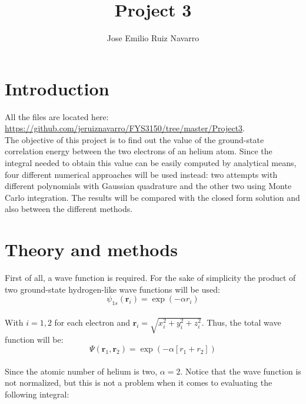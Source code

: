 \documentclass[11pt,a4paper,oneside]{article}
\begin{document}
	\title{\textbf{\textbf{\Huge Project 3}}}
	\author{Jose Emilio Ruiz Navarro}
	\maketitle
	
	\section{Introduction}
	
		All the files are located here: \url{https://github.com/jeruiznavarro/FYS3150/tree/master/Project3}.\\
	
		The objective of this project is to find out the value of the ground-state correlation energy between the two electrons of an helium atom. Since the integral needed to obtain this value can be easily computed by analytical means, four different numerical approaches will be used instead: two attempts with different polynomials with Gaussian quadrature and the other two using Monte Carlo integration. The results will be compared with the closed form solution and also between the different methods.\\
	
	\section{Theory and methods}
	
		First of all, a wave function is required. For the sake of simplicity the product of two ground-state hydrogen-like wave functions will be used:\\
	
		\begin{equation*}\psi_{1s}\left(\boldsymbol{r}_i\right)=\exp{\left(-\alpha r_i\right)}\end{equation*}\\
		
		With $i=1,2$ for each electron and $\boldsymbol{r}_i=\sqrt{x_i^2+y_i^2+z_i^2}$. Thus, the total wave function will be:\\
		
		\begin{equation*}\Psi\left(\boldsymbol{r}_1,\boldsymbol{r}_2\right)=\exp{\left(-\alpha\left[r_1+r_2\right]\right)}\end{equation*}\\
		
		Since the atomic number of helium is two, $\alpha=2$. Notice that the wave function is not normalized, but this is not a problem when it comes to evaluating the following integral:\\
		
\end{document}
